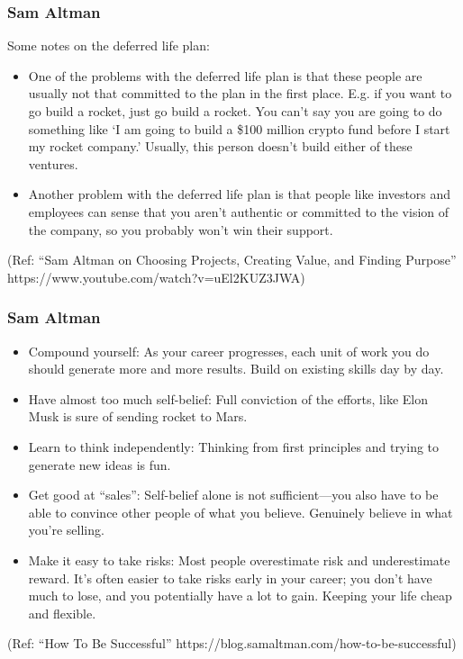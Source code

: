 \begin{frame}[fragile]\frametitle{Sam Altman}

Some notes on the deferred life plan:

\begin{itemize}

\item One of the problems with the deferred life plan is that these people are usually not that committed to the plan in the first place. E.g. if you want to go build a rocket, just go build a rocket. You can’t say you are going to do something like ‘I am going to build a \$100 million crypto fund before I start my rocket company.’ Usually, this person doesn’t build either of these ventures. 
\item Another problem with the deferred life plan is that people like investors and employees can sense that you aren’t authentic or committed to the vision of the company, so you probably won’t win their support.
\end{itemize}

{\tiny (Ref: ``Sam Altman on Choosing Projects, Creating Value, and Finding Purpose'' https://www.youtube.com/watch?v=uEl2KUZ3JWA)}
\end{frame}

\begin{frame}[fragile]\frametitle{Sam Altman}

\begin{itemize}
\item Compound yourself: As your career progresses, each unit of work you do should generate more and more results. Build on existing skills day by day.
\item Have almost too much self-belief: Full conviction of the efforts, like Elon Musk is sure of sending rocket to Mars.
\item Learn to think independently: Thinking from first principles and trying to generate new ideas is fun.
\item Get good at “sales”: Self-belief alone is not sufficient—you also have to be able to convince other people of what you believe. Genuinely believe in what you’re selling.
\item Make it easy to take risks: Most people overestimate risk and underestimate reward. It’s often easier to take risks early in your career; you don’t have much to lose, and you potentially have a lot to gain. Keeping your life cheap and flexible.
\end{itemize}

{\tiny (Ref: ``How To Be Successful'' https://blog.samaltman.com/how-to-be-successful)}
\end{frame}


